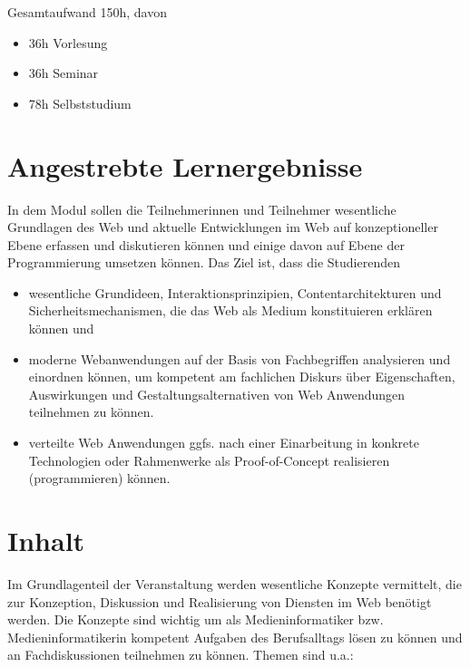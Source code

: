 Gesamtaufwand 150h, davon

\begin{itemize}
\tightlist
\item
  36h Vorlesung
\item
  36h Seminar
\item
  78h Selbststudium
\end{itemize}

\hypertarget{angestrebte-lernergebnissepathlabelmi-2017modulbeschreibungen-bachelorba_grundlagen-des-web}{%
\section*{Angestrebte
Lernergebnisse\label{/mi-2017/modulbeschreibungen-bachelor/BA_Grundlagen-des-web}}\label{angestrebte-lernergebnissepathlabelmi-2017modulbeschreibungen-bachelorba_grundlagen-des-web}}

In dem Modul sollen die Teilnehmerinnen und Teilnehmer wesentliche
Grundlagen des Web und aktuelle Entwicklungen im Web auf konzeptioneller
Ebene erfassen und diskutieren können und einige davon auf Ebene der
Programmierung umsetzen können. Das Ziel ist, dass die Studierenden

\begin{itemize}
\tightlist
\item
  wesentliche Grundideen, Interaktionsprinzipien, Contentarchitekturen
  und Sicherheitsmechanismen, die das Web als Medium konstituieren
  erklären können und
\item
  moderne Webanwendungen auf der Basis von Fachbegriffen analysieren und
  einordnen können, um kompetent am fachlichen Diskurs über
  Eigenschaften, Auswirkungen und Gestaltungsalternativen von Web
  Anwendungen teilnehmen zu können.
\item
  verteilte Web Anwendungen ggfs. nach einer Einarbeitung in konkrete
  Technologien oder Rahmenwerke als Proof-of-Concept realisieren
  (programmieren) können.
\end{itemize}

\hypertarget{inhaltpathlabelmi-2017modulbeschreibungen-bachelorba_grundlagen-des-web}{%
\section*{Inhalt\label{/mi-2017/modulbeschreibungen-bachelor/BA_Grundlagen-des-web}}\label{inhaltpathlabelmi-2017modulbeschreibungen-bachelorba_grundlagen-des-web}}

Im Grundlagenteil der Veranstaltung werden wesentliche Konzepte
vermittelt, die zur Konzeption, Diskussion und Realisierung von Diensten
im Web benötigt werden. Die Konzepte sind wichtig um als
Medieninformatiker bzw. Medieninformatikerin kompetent Aufgaben des
Berufsalltags lösen zu können und an Fachdiskussionen teilnehmen zu
können. Themen sind u.a.:

